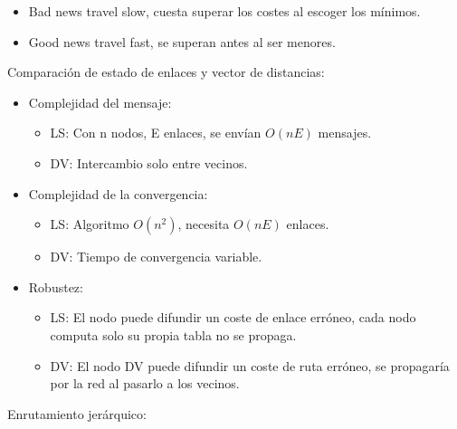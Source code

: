 \documentclass[12pt, twoside, openright]{report} %
\begin{document}
\begin{itemize}
\begin{itemize}
		            \begin{itemize}
			            \item Bad news travel slow, cuesta superar los costes al escoger los
			                  mínimos.
			            \item Good news travel fast, se superan antes al ser menores.
		            \end{itemize}
	      \end{itemize}
\end{itemize}


Comparación de estado de enlaces y vector de distancias:

\begin{itemize}
	\item Complejidad del mensaje:

	      \begin{itemize}
		      \item LS: Con n nodos, E enlaces, se envían \(O(nE)\) mensajes.
		      \item DV: Intercambio solo entre vecinos.
	      \end{itemize}
	\item Complejidad de la convergencia:

	      \begin{itemize}
		      \item LS: Algoritmo \(O(n^2)\), necesita \(O(nE)\) enlaces.
		      \item DV: Tiempo de convergencia variable.
	      \end{itemize}
	\item Robustez:

	      \begin{itemize}
		      \item LS: El nodo puede difundir un coste de enlace erróneo, cada nodo
		            computa solo su propia tabla no se propaga.
		      \item DV: El nodo DV puede difundir un coste de ruta erróneo, se
		            propagaría por la red al pasarlo a los vecinos.
	      \end{itemize}
\end{itemize}

Enrutamiento jerárquico:
\end{document}
